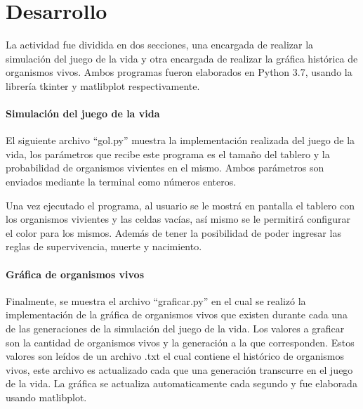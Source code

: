 \section{Desarrollo}
	La actividad fue dividida en dos secciones, una encargada de realizar la simulación del juego de la vida y otra encargada de realizar la gráfica histórica de organismos vivos. Ambos programas fueron elaborados en Python 3.7, usando la librería tkinter y matlibplot respectivamente.
	\paragraph{Simulación del juego de la vida}
	El siguiente archivo ``gol.py'' muestra la implementación realizada del juego de la vida, los parámetros que recibe este programa es el tamaño del tablero y la probabilidad de organismos vivientes en el mismo. Ambos parámetros son enviados mediante la terminal como números enteros.

	Una vez ejecutado el programa, al usuario se le mostrá en pantalla el tablero con los organismos vivientes y las celdas vacías, así mismo se le permitirá configurar el color para los mismos. Además de tener la posibilidad de poder ingresar las reglas de supervivencia, muerte y nacimiento.

	

	\paragraph{Gráfica de organismos vivos}
	Finalmente, se muestra el archivo ``graficar.py'' en el cual se realizó la implementación de la gráfica de organismos vivos que existen durante cada una de las generaciones de la simulación del juego de la vida. Los valores a graficar son la cantidad de organismos vivos y la generación a la que corresponden. Estos valores son leídos de un archivo .txt el cual contiene el histórico de organismos vivos, este archivo es actualizado cada que una generación transcurre en el juego de la vida. La gráfica se actualiza automaticamente cada segundo y fue elaborada usando matlibplot. 
	


